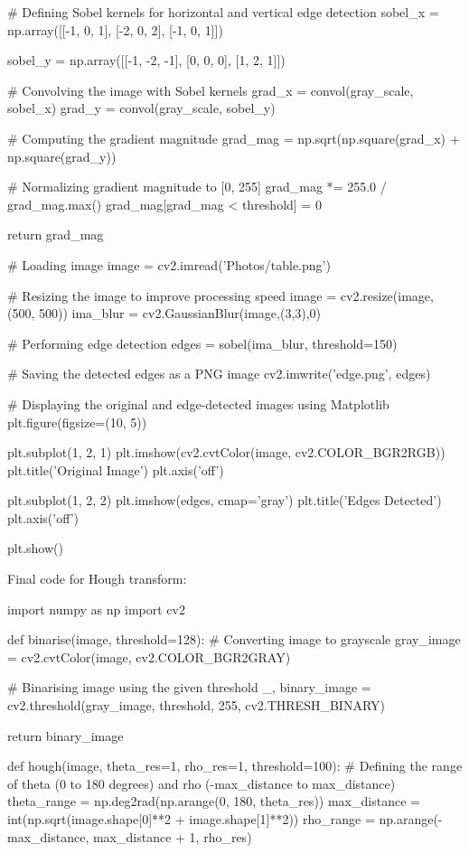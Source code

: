\documentclass[letterpaper, 10 pt, conference]{ieeeconf}
\begin{document}
    # Defining Sobel kernels for horizontal and vertical edge detection
    sobel_x = np.array([[-1, 0, 1],
                        [-2, 0, 2],
                        [-1, 0, 1]])
    
    sobel_y = np.array([[-1, -2, -1],
                        [0, 0, 0],
                        [1, 2, 1]])
    
    # Convolving the image with Sobel kernels
    grad_x = convol(gray_scale, sobel_x)
    grad_y = convol(gray_scale, sobel_y)
    
    # Computing the gradient magnitude
    grad_mag = np.sqrt(np.square(grad_x) + np.square(grad_y))
    
    # Normalizing gradient magnitude to [0, 255]
    grad_mag *= 255.0 / grad_mag.max()
    grad_mag[grad_mag < threshold] = 0

    return grad_mag
    

# Loading image
image = cv2.imread('Photos/table.png')

# Resizing the image to improve processing speed
image = cv2.resize(image, (500, 500))
ima_blur = cv2.GaussianBlur(image,(3,3),0)

# Performing edge detection
edges = sobel(ima_blur, threshold=150)

# Saving the detected edges as a PNG image
cv2.imwrite('edge.png', edges)


# Displaying the original and edge-detected images using Matplotlib
plt.figure(figsize=(10, 5))

plt.subplot(1, 2, 1)
plt.imshow(cv2.cvtColor(image, cv2.COLOR_BGR2RGB))
plt.title('Original Image')
plt.axis('off')

plt.subplot(1, 2, 2)
plt.imshow(edges, cmap='gray')
plt.title('Edges Detected')
plt.axis('off')

plt.show()




Final code for Hough transform:

import numpy as np
import cv2

def binarise(image, threshold=128):
    # Converting image to grayscale
    gray_image = cv2.cvtColor(image, cv2.COLOR_BGR2GRAY)
    
    # Binarising image using the given threshold
    _, binary_image = cv2.threshold(gray_image, threshold, 255, cv2.THRESH_BINARY)
    
    return binary_image

def hough(image, theta_res=1, rho_res=1, threshold=100):
    # Defining the range of theta (0 to 180 degrees) and rho (-max_distance to max_distance)
    theta_range = np.deg2rad(np.arange(0, 180, theta_res))
    max_distance = int(np.sqrt(image.shape[0]**2 + image.shape[1]**2))
    rho_range = np.arange(-max_distance, max_distance + 1, rho_res)
    
\end{document}
